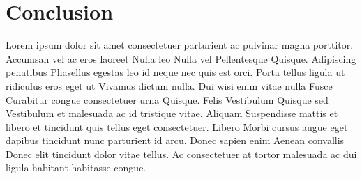 \thispagestyle{firstPageOfChapter}
\chapter{Conclusion} \label{chap:conclusion}
Lorem ipsum dolor sit amet consectetuer parturient ac pulvinar magna porttitor. Accumsan vel ac eros laoreet Nulla leo Nulla vel Pellentesque Quisque. Adipiscing penatibus Phasellus egestas leo id neque nec quis est orci. Porta tellus ligula ut ridiculus eros eget ut Vivamus dictum nulla. Dui wisi enim vitae nulla Fusce Curabitur congue consectetuer urna Quisque. Felis Vestibulum Quisque sed Vestibulum et malesuada ac id tristique vitae. Aliquam Suspendisse mattis et libero et tincidunt quis tellus eget consectetuer. Libero Morbi cursus augue eget dapibus tincidunt nunc parturient id arcu. Donec sapien enim Aenean convallis Donec elit tincidunt dolor vitae tellus. Ac consectetuer at tortor malesuada ac dui ligula habitant habitasse congue. 
